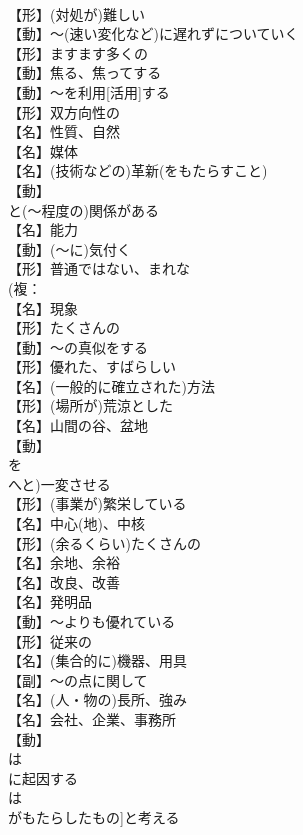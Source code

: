 \documentclass[8pt]{extreport}
\begin{document}
\begin{CJK}{UTF8}{min}
\\	【形】(対処が)難しい
\\	【動】～(速い変化など)に遅れずについていく
\\	【形】ますます多くの
\\	【動】焦る、焦ってする
\\	【動】～を利用[活用]する
\\	【形】双方向性の
\\	【名】性質、自然
\\	【名】媒体
\\	【名】(技術などの)革新(をもたらすこと)
\\	【動】
\\	と(～程度の)関係がある
\\	【名】能力
\\	【動】(～に)気付く
\\	【形】普通ではない、まれな
\\	(複：
\\	【名】現象
\\	【形】たくさんの
\\	【動】～の真似をする
\\	【形】優れた、すばらしい
\\	【名】(一般的に確立された)方法
\\	【形】(場所が)荒涼とした
\\	【名】山間の谷、盆地
\\	【動】
\\	を
\\	へと)一変させる
\\	【形】(事業が)繁栄している
\\	【名】中心(地)、中核
\\	【形】(余るくらい)たくさんの
\\	【名】余地、余裕
\\	【名】改良、改善
\\	【名】発明品
\\	【動】～よりも優れている
\\	【形】従来の
\\	【名】(集合的に)機器、用具
\\	【副】～の点に関して
\\	【名】(人・物の)長所、強み
\\	【名】会社、企業、事務所
\\	【動】
\\	は
\\	に起因する
\\	は
\\	がもたらしたもの]と考える

\end{CJK}
\end{document}

